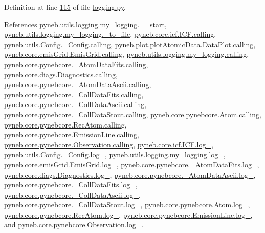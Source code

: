 Definition at line \hyperlink{logging_8py_source_l00115}{115} of file \hyperlink{logging_8py_source}{logging.\-py}.



References \hyperlink{logging_8py_source_l00042}{pyneb.\-utils.\-logging.\-my\-\_\-logging.\-\_\-\-\_\-start}, \hyperlink{logging_8py_source_l00179}{pyneb.\-utils.\-logging.\-my\-\_\-logging.\-\_\-to\-\_\-file}, \hyperlink{icf_8py_source_l00016}{pyneb.\-core.\-icf.\-I\-C\-F.\-calling}, \hyperlink{_config_8py_source_l00032}{pyneb.\-utils.\-Config.\-\_\-\-Config.\-calling}, \hyperlink{plot_atomic_data_8py_source_l00042}{pyneb.\-plot.\-plot\-Atomic\-Data.\-Data\-Plot.\-calling}, \hyperlink{emis_grid_8py_source_l00044}{pyneb.\-core.\-emis\-Grid.\-Emis\-Grid.\-calling}, \hyperlink{logging_8py_source_l00044}{pyneb.\-utils.\-logging.\-my\-\_\-logging.\-calling}, \hyperlink{pynebcore_8py_source_l00097}{pyneb.\-core.\-pynebcore.\-\_\-\-Atom\-Data\-Fits.\-calling}, \hyperlink{diags_8py_source_l00169}{pyneb.\-core.\-diags.\-Diagnostics.\-calling}, \hyperlink{pynebcore_8py_source_l00318}{pyneb.\-core.\-pynebcore.\-\_\-\-Atom\-Data\-Ascii.\-calling}, \hyperlink{pynebcore_8py_source_l00585}{pyneb.\-core.\-pynebcore.\-\_\-\-Coll\-Data\-Fits.\-calling}, \hyperlink{pynebcore_8py_source_l00936}{pyneb.\-core.\-pynebcore.\-\_\-\-Coll\-Data\-Ascii.\-calling}, \hyperlink{pynebcore_8py_source_l01156}{pyneb.\-core.\-pynebcore.\-\_\-\-Coll\-Data\-Stout.\-calling}, \hyperlink{pynebcore_8py_source_l01229}{pyneb.\-core.\-pynebcore.\-Atom.\-calling}, \hyperlink{pynebcore_8py_source_l02643}{pyneb.\-core.\-pynebcore.\-Rec\-Atom.\-calling}, \hyperlink{pynebcore_8py_source_l03385}{pyneb.\-core.\-pynebcore.\-Emission\-Line.\-calling}, \hyperlink{pynebcore_8py_source_l03541}{pyneb.\-core.\-pynebcore.\-Observation.\-calling}, \hyperlink{icf_8py_source_l00015}{pyneb.\-core.\-icf.\-I\-C\-F.\-log\-\_\-}, \hyperlink{_config_8py_source_l00031}{pyneb.\-utils.\-Config.\-\_\-\-Config.\-log\-\_\-}, \hyperlink{logging_8py_source_l00033}{pyneb.\-utils.\-logging.\-my\-\_\-logging.\-log\-\_\-}, \hyperlink{emis_grid_8py_source_l00043}{pyneb.\-core.\-emis\-Grid.\-Emis\-Grid.\-log\-\_\-}, \hyperlink{pynebcore_8py_source_l00087}{pyneb.\-core.\-pynebcore.\-\_\-\-Atom\-Data\-Fits.\-log\-\_\-}, \hyperlink{diags_8py_source_l00168}{pyneb.\-core.\-diags.\-Diagnostics.\-log\-\_\-}, \hyperlink{pynebcore_8py_source_l00308}{pyneb.\-core.\-pynebcore.\-\_\-\-Atom\-Data\-Ascii.\-log\-\_\-}, \hyperlink{pynebcore_8py_source_l00574}{pyneb.\-core.\-pynebcore.\-\_\-\-Coll\-Data\-Fits.\-log\-\_\-}, \hyperlink{pynebcore_8py_source_l00923}{pyneb.\-core.\-pynebcore.\-\_\-\-Coll\-Data\-Ascii.\-log\-\_\-}, \hyperlink{pynebcore_8py_source_l01155}{pyneb.\-core.\-pynebcore.\-\_\-\-Coll\-Data\-Stout.\-log\-\_\-}, \hyperlink{pynebcore_8py_source_l01216}{pyneb.\-core.\-pynebcore.\-Atom.\-log\-\_\-}, \hyperlink{pynebcore_8py_source_l02633}{pyneb.\-core.\-pynebcore.\-Rec\-Atom.\-log\-\_\-}, \hyperlink{pynebcore_8py_source_l03384}{pyneb.\-core.\-pynebcore.\-Emission\-Line.\-log\-\_\-}, and \hyperlink{pynebcore_8py_source_l03540}{pyneb.\-core.\-pynebcore.\-Observation.\-log\-\_\-}.


